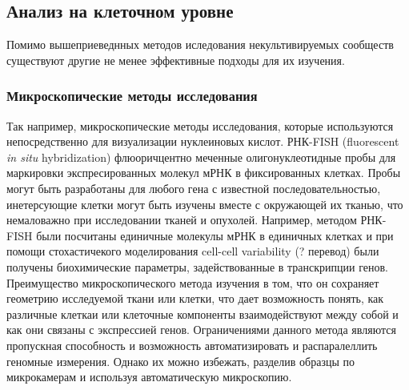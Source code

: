 \subsection{Анализ на клеточном уровне}
Помимо вышеприеведнных методов иследования некультивируемых сообществ существуют другие не менее эффективные подходы для их изучения.

\subsubsection{Микроскопические методы исследования}
Так например, микроскопические методы исследования, которые используются непосредственно для визуализации нуклеиновых кислот. РНК-FISH (fluorescent \textit{in situ} hybridization)
флюоричцентно меченные олигонуклеотидные пробы для маркировки экспресированных молекул мРНК в фиксированных клетках. Пробы могут быть разработаны для любого гена с
известной последовательностью, инетерсующие клетки могут быть изучены вместе с окружающей их тканью, что немаловажно при исследовании тканей и опухолей. Например, методом
РНК-FISH были посчитаны единичные молекулы мРНК в единичных клетках и при помощи
стохастичекого моделирования cell-cell variability (? перевод) были получены биохимические
параметры, задействованные в транскрипции генов. Преимущество микроскопического метода изучения в том, что он сохраняет геометрию исследуемой ткани или клетки, что дает
возможность понять, как различные клеткаи или клеточные компоненты взаимодействуют
между собой и как они связаны с экспрессией генов. Ограничениями данного метода являются пропускная способность и возможность автоматизировать и распаралеллить геномные
измерения. Однако их можно избежать, разделив образцы по микрокамерам и используя
автоматическую микроскопию.


